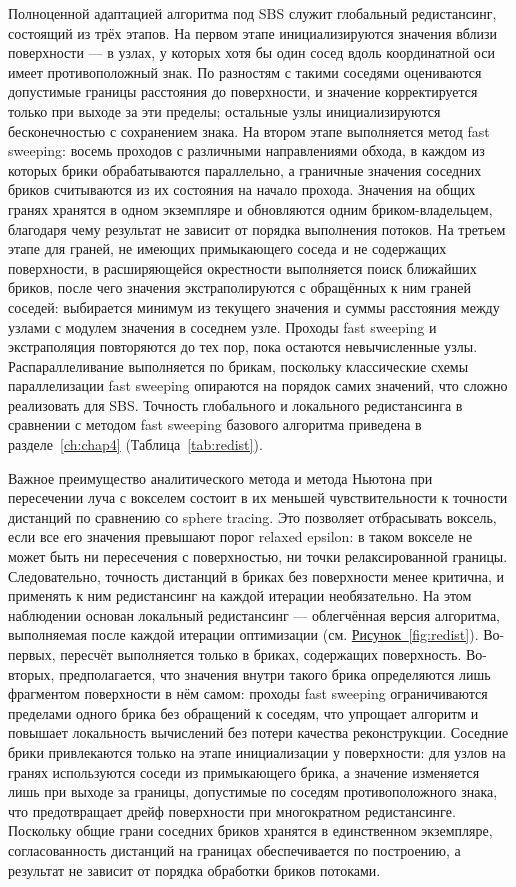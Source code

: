 Полноценной адаптацией алгоритма под SBS служит глобальный редистансинг,
состоящий из трёх этапов. На первом этапе инициализируются значения вблизи
поверхности --- в узлах, у которых хотя бы один сосед вдоль координатной оси
имеет противоположный знак. По разностям с такими соседями оцениваются
допустимые границы расстояния до поверхности, и значение корректируется только
при выходе за эти пределы; остальные узлы инициализируются бесконечностью с
сохранением знака. На втором этапе выполняется метод fast sweeping: восемь
проходов с различными направлениями обхода, в каждом из которых брики
обрабатываются параллельно, а граничные значения соседних бриков считываются из
их состояния на начало прохода. Значения на общих гранях хранятся в одном
экземпляре и обновляются одним бриком-владельцем, благодаря чему результат не
зависит от порядка выполнения потоков. На третьем этапе для граней, не имеющих
примыкающего соседа и не содержащих поверхности, в расширяющейся окрестности
выполняется поиск ближайших бриков, после чего значения экстраполируются с
обращённых к ним граней соседей: выбирается минимум из текущего значения и суммы
расстояния между узлами с модулем значения в соседнем узле. Проходы fast
sweeping и экстраполяция повторяются до тех пор, пока остаются невычисленные
узлы. Распараллеливание выполняется по брикам, поскольку классические схемы
параллелизации fast sweeping опираются на порядок самих значений, что сложно
реализовать для SBS. Точность глобального и локального редистансинга в
сравнении с методом fast sweeping базового алгоритма приведена в
разделе~\ref{ch:chap4} (Таблица~\ref{tab:redist}).

Важное преимущество аналитического метода и метода Ньютона при пересечении луча
с вокселем состоит в их меньшей чувствительности к точности дистанций по
сравнению со sphere tracing. Это позволяет отбрасывать воксель, если все его
значения превышают порог relaxed epsilon: в таком вокселе не может быть ни
пересечения с поверхностью, ни точки релаксированной границы. Следовательно,
точность дистанций в бриках без поверхности менее критична, и применять к ним
редистансинг на каждой итерации необязательно. На этом наблюдении основан
локальный редистансинг --- облегчённая версия алгоритма, выполняемая после
каждой итерации оптимизации (см. \hyperref[fig:redist]{Рисунок~\ref*{fig:redist}}).
Во-первых, пересчёт выполняется только в бриках, содержащих поверхность.
Во-вторых, предполагается, что значения внутри такого брика определяются лишь
фрагментом поверхности в нём самом: проходы fast sweeping ограничиваются
пределами одного брика без обращений к соседям, что упрощает алгоритм и
повышает локальность вычислений без потери качества реконструкции. Соседние
брики привлекаются только на этапе инициализации у поверхности: для узлов на
гранях используются соседи из примыкающего брика, а значение изменяется лишь
при выходе за границы, допустимые по соседям противоположного знака, что
предотвращает дрейф поверхности при многократном редистансинге. Поскольку общие
грани соседних бриков хранятся в единственном экземпляре, согласованность
дистанций на границах обеспечивается по построению, а результат не зависит от
порядка обработки бриков потоками.

